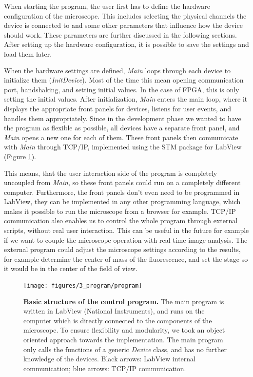 \documentclass{diploma_style}
\begin{document}
When starting the program, the user first has to define the hardware configuration of the microscope. This includes selecting the physical channels the device is connected to and some other parameters that influence how the device should work. These parameters are further discussed in the following sections. After setting up the hardware configuration, it is possible to save the settings and load them later.

When the hardware settings are defined, \emph{Main} loops through each device to initialize them (\emph{InitDevice}). Most of the time this mean opening communication port, handshaking, and setting initial values. In the case of FPGA, this is only setting the initial values. After initialization, \emph{Main} enters the main loop, where it displays the appropriate front panels for devices, listens for user events, and handles them appropriately. Since in the development phase we wanted to have the program as flexible as possible, all devices have a separate front panel, and \emph{Main} opens a new one for each of them. These front panels then communicate with \emph{Main} through TCP/IP, implemented using the STM package for LabView (Figure \ref{fig:program}).

This means, that the user interaction side of the program is completely uncoupled from \emph{Main}, so these front panels could run on a completely different computer. Furthermore, the front panels don't even need to be programmed in LabView, they can be implemented in any other programming language, which makes it possible to run the microscope from a browser for example. TCP/IP communication also enables us to control the whole program through external scripts, without real user interaction. This can be useful in the future for example if we want to couple the microscope operation with real-time image analysis. The external program could adjust the microscope settings according to the results, for example determine the center of mass of the fluorescence, and set the stage so it would be in the center of the field of view.


\begin{figure}[htpb]
	\centering
	\texttt{[image: figures/3\_program/program]}
	\caption{\textbf{Basic structure of the control program.} The main program is written in LabView (National Instruments), and runs on the computer which is directly connected to the components of the microscope. To ensure flexibility and modularity, we took an object oriented approach towards the implementation. The main program only calls the functions of a generic \emph{Device} class, and has no further knowledge of the devices. Black arrows: LabView internal communication; blue arrows: TCP/IP communication.}
	\label{fig:program}
\end{figure}
\end{document}
